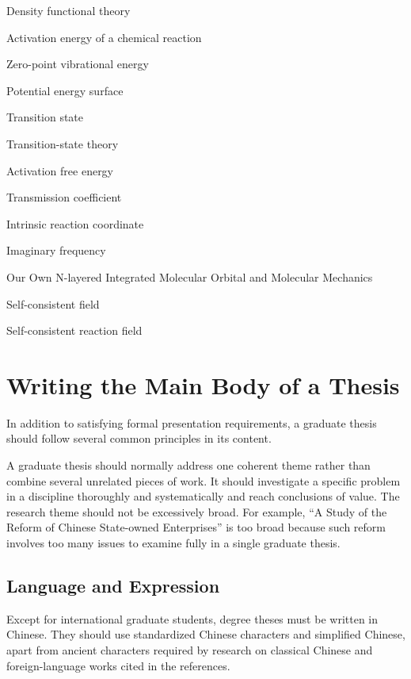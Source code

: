 \documentclass{thuthesis}
\begin{document}
\begin{denotation}[3cm]
\item[DFT] Density functional theory
\item[$E_a$] Activation energy of a chemical reaction
\item[ZPE] Zero-point vibrational energy
\item[PES] Potential energy surface
\item[TS] Transition state
\item[TST] Transition-state theory
\item[$\increment G^\neq$] Activation free energy
\item[$\kappa$] Transmission coefficient
\item[IRC] Intrinsic reaction coordinate
\item[$\nu_i$] Imaginary frequency
\item[ONIOM] Our Own N-layered Integrated Molecular Orbital and
  Molecular Mechanics
\item[SCF] Self-consistent field
\item[SCRF] Self-consistent reaction field
\end{denotation}

\mainmatter

\chapter{Writing the Main Body of a Thesis}

In addition to satisfying formal presentation requirements, a graduate thesis
should follow several common principles in its content.

A graduate thesis should normally address one coherent theme rather than combine
several unrelated pieces of work. It should investigate a specific problem in a
discipline thoroughly and systematically and reach conclusions of value. The
research theme should not be excessively broad. For example, ``A Study of the
Reform of Chinese State-owned Enterprises'' is too broad because such reform
involves too many issues to examine fully in a single graduate thesis.

\section{Language and Expression}

Except for international graduate students, degree theses must be written in
Chinese. They should use standardized Chinese characters and simplified Chinese,
apart from ancient characters required by research on classical Chinese and
foreign-language works cited in the references.
\end{document}
